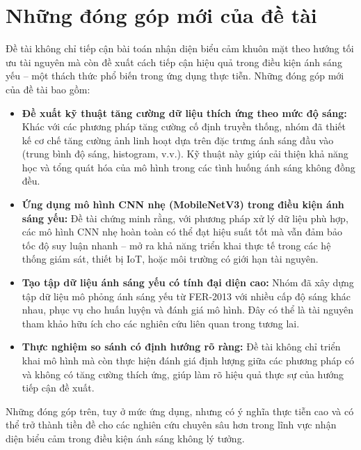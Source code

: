 \section{Những đóng góp mới của đề tài} %

Đề tài không chỉ tiếp cận bài toán nhận diện biểu cảm khuôn mặt theo hướng tối ưu tài nguyên mà còn đề xuất cách tiếp cận hiệu quả trong điều kiện ánh sáng yếu – một thách thức phổ biến trong ứng dụng thực tiễn. Những đóng góp mới của đề tài bao gồm:

\begin{itemize}
    \item \textbf{Đề xuất kỹ thuật tăng cường dữ liệu thích ứng theo mức độ sáng:} Khác với các phương pháp tăng cường cố định truyền thống, nhóm đã thiết kế cơ chế tăng cường ảnh linh hoạt dựa trên đặc trưng ánh sáng đầu vào (trung bình độ sáng, histogram, v.v.). Kỹ thuật này giúp cải thiện khả năng học và tổng quát hóa của mô hình trong các tình huống ánh sáng không đồng đều.

    \item \textbf{Ứng dụng mô hình CNN nhẹ (MobileNetV3) trong điều kiện ánh sáng yếu:} Đề tài chứng minh rằng, với phương pháp xử lý dữ liệu phù hợp, các mô hình CNN nhẹ hoàn toàn có thể đạt hiệu suất tốt mà vẫn đảm bảo tốc độ suy luận nhanh – mở ra khả năng triển khai thực tế trong các hệ thống giám sát, thiết bị IoT, hoặc môi trường có giới hạn tài nguyên.

    \item \textbf{Tạo tập dữ liệu ánh sáng yếu có tính đại diện cao:} Nhóm đã xây dựng tập dữ liệu mô phỏng ánh sáng yếu từ FER-2013 với nhiều cấp độ sáng khác nhau, phục vụ cho huấn luyện và đánh giá mô hình. Đây có thể là tài nguyên tham khảo hữu ích cho các nghiên cứu liên quan trong tương lai.

    \item \textbf{Thực nghiệm so sánh có định hướng rõ ràng:} Đề tài không chỉ triển khai mô hình mà còn thực hiện đánh giá định lượng giữa các phương pháp có và không có tăng cường thích ứng, giúp làm rõ hiệu quả thực sự của hướng tiếp cận đề xuất.

\end{itemize}

Những đóng góp trên, tuy ở mức ứng dụng, nhưng có ý nghĩa thực tiễn cao và có thể trở thành tiền đề cho các nghiên cứu chuyên sâu hơn trong lĩnh vực nhận diện biểu cảm trong điều kiện ánh sáng không lý tưởng.